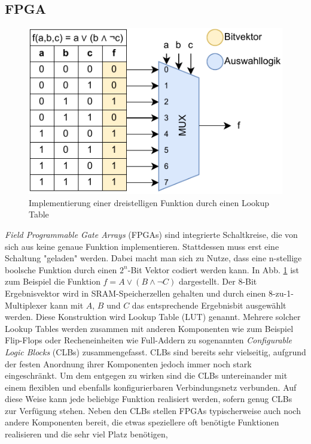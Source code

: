 \subsection{FPGA}
\label{sec:fpga}
\begin{figure}
    \center
    \includegraphics{images/LUT.pdf}
    \caption{Implementierung einer dreistelligen Funktion durch einen Lookup Table}
    \label{fig:fpga_lut}
\end{figure}
\textit{Field Programmable Gate Arrays} (FPGAs) sind integrierte Schaltkreise, die von sich aus keine genaue Funktion implementieren.
Stattdessen muss erst eine Schaltung "geladen" werden. Dabei macht man sich zu Nutze, dass eine n-stellige boolsche Funktion
durch einen $2^n$-Bit Vektor codiert werden kann. In Abb. \ref{fig:fpga_lut} ist zum Beispiel die Funktion
$f = A \vee (B \wedge \neg C)$ dargestellt. Der 8-Bit Ergebnisvektor wird in SRAM-Speicherzellen gehalten und durch einen 8-zu-1-Multiplexer
kann mit $A$, $B$ und $C$ das entsprechende Ergebnisbit ausgewählt werden. Diese Konstruktion wird Lookup Table (LUT) genannt.
Mehrere solcher Lookup Tables werden zusammen mit anderen Komponenten wie zum Beispiel Flip-Flops oder Recheneinheiten
wie Full-Addern zu sogenannten \textit{Configurable Logic Blocks} (CLBs) zusammengefasst. CLBs sind bereits sehr vielseitig,
aufgrund der festen Anordnung ihrer Komponenten jedoch immer noch stark eingeschränkt. Um dem entgegen zu wirken sind die CLBs
untereinander mit einem flexiblen und ebenfalls konfigurierbaren Verbindungsnetz verbunden. Auf diese Weise kann jede beliebige
Funktion realisiert werden, sofern genug CLBs zur Verfügung stehen. Neben den CLBs stellen FPGAs typischerweise auch noch andere
Komponenten bereit, die etwas speziellere oft benötigte Funktionen realisieren und die sehr viel Platz benötigen,
